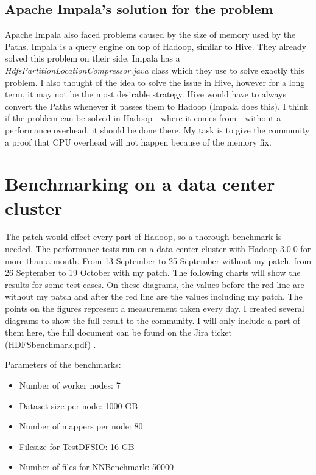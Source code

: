 \subsection{Apache Impala's solution for the problem}
Apache Impala also faced problems caused by the size of memory used by the Paths. Impala is a query engine on top of Hadoop, similar to Hive. They already solved this problem on their side. Impala has a \textit{HdfsPartitionLocationCompressor.java \cite{impala-solution}} class which they use to solve exactly this problem. I also thought of the idea to solve the issue in Hive, however for a long term, it may not be the most desirable strategy. Hive would have to always convert the Paths whenever it passes them to Hadoop (Impala does this). I think if the problem can be solved in  Hadoop - where it comes from - without a performance overhead, it should be done there. My task is to give the community a proof that CPU overhead will not happen because of the memory fix. 

\section{Benchmarking on a data center cluster}
The patch would effect every part of Hadoop, so a thorough benchmark is needed. The performance tests run on a data center cluster with Hadoop 3.0.0 for more than a month. From 13 September to 25 September without my patch, from 26 September to 19 October with my patch. The following charts will show the results for some test cases. On these diagrams, the values before the red line are without my patch and after the red line are the values including my patch. The points on the figures represent a measurement taken every day. I created several diagrams to show the full result to the community. I will only include a part of them here, the full document can be found on the Jira ticket (HDFSbenchmark.pdf) \cite{hdfs-path}.

\noindent Parameters of the benchmarks: 
\begin{itemize}
	\setlength{\itemsep}{1pt}
	\item Number of worker nodes: 7
	\item Dataset size per node: 1000 GB
	\item Number of mappers per node: 80
	\item Filesize for TestDFSIO: 16 GB
	\item Number of files for NNBenchmark: 50000
\end{itemize}

